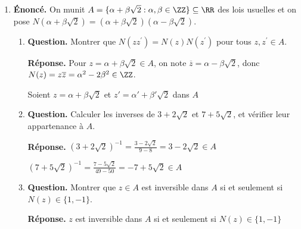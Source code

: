 \documentclass[12pt, a4paper]{article}
\begin{document}
\begin{enumerate}[label=2.\arabic*., start=17]
  \item \begin{minipage}[t]{\linewidth}\raggedright
\textbf{Énoncé.} On munit $A=\{\alpha+\beta\sqrt2:\alpha,\beta\in\ZZ\}\subseteq\RR$ des lois usuelles et on pose $N(\alpha+\beta\sqrt2)=(\alpha+\beta\sqrt2)(\alpha-\beta\sqrt2)$.

\begin{enumerate}[\arabic*.]
        \item \textbf{Question.} Montrer que $N(zz^{\prime})=N(z)N(z^{\prime})$ pour tous $z,z^{\prime}\in A$.
\par\smallskip
\textbf{Réponse.} Pour $z = \alpha + \beta\sqrt 2 \in A$, on note $\overline z = \alpha - \beta\sqrt 2$, donc $N(z) = z\overline z = \alpha^2 - 2\beta^2 \in \ZZ$.

Soient $z = \alpha + \beta\sqrt 2$ et $z' = \alpha' + \beta'\sqrt 2$ dans $A$

  \item \textbf{Question.} Calculer les inverses de $3+2\sqrt2$ et $7+5\sqrt2$, et vérifier leur appartenance à $A$.
\par\smallskip
\textbf{Réponse.} $\displaystyle (3+2\sqrt 2)^{-1} = \frac{3-2\sqrt 2}{9-8} = 3-2\sqrt 2 \in A$

        $\displaystyle (7+5\sqrt 2)^{-1} = \frac{7-5\sqrt 2}{49-50} = -7+5\sqrt 2 \in A$

  \item \textbf{Question.} Montrer que $z\in A$ est inversible dans $A$ si et seulement si $N(z)\in\{1,-1\}$.
\par\smallskip
\textbf{Réponse.} $z$ est inversible dans $A$ si et seulement si $N(z) \in \{1,-1\}$


\end{enumerate}
\end{minipage}
\end{enumerate}
\end{document}
